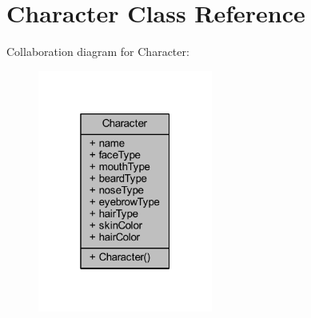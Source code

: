 \hypertarget{class_character}{}\section{Character Class Reference}
\label{class_character}


Collaboration diagram for Character\+:
\nopagebreak
\begin{figure}[H]
\begin{center}
\leavevmode
\includegraphics[width=163pt]{class_character__coll__graph}
\end{center}
\end{figure}
